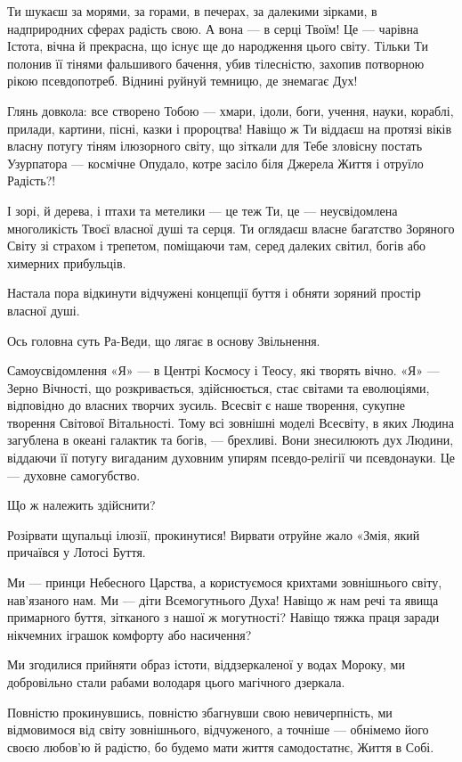 Ти шукаєш за морями, за горами, в печерах, за далекими зірками, в надприродних
сферах радість свою. А вона — в серці Твоїм! Це — чарівна Істота, вічна й
прекрасна, що існує ще до народження цього світу. Тільки Ти полонив її тінями
фальшивого бачення, убив тілесністю, захопив потворною рікою псевдопотреб.
Віднині руйнуй темницю, де знемагає Дух!

Глянь довкола: все створено Тобою — хмари, ідоли, боги, учення, науки, кораблі,
прилади, картини, пісні, казки і пророцтва! Навіщо ж Ти віддаєш на протязі
віків власну потугу тіням ілюзорного світу, що зіткали для Тебе зловісну
постать Узурпатора — космічне Опудало, котре засіло біля Джерела Життя і
отруїло Радість?!

І зорі, й дерева, і птахи та метелики — це теж Ти, це — неусвідомлена
многоликість Твоєї власної душі та серця. Ти оглядаєш власне багатство Зоряного
Світу зі страхом і трепетом, поміщаючи там, серед далеких світил, богів або
химерних прибульців.

Настала пора відкинути відчужені концепції буття і обняти зоряний простір
власної душі.

Ось головна суть Ра-Веди, що лягає в основу Звільнення.

Самоусвідомлення «Я» — в Центрі Космосу і Теосу, які творять вічно. «Я» — Зерно
Вічності, що розкривається, здійснюється, стає світами та еволюціями,
відповідно до власних творчих зусиль. Всесвіт є наше творення, сукупне творення
Світової Вітальності. Тому всі зовнішні моделі Всесвіту, в яких Людина
загублена в океані галактик та богів, — брехливі. Вони знесилюють дух Людини,
віддаючи її потугу вигаданим духовним упирям псевдо-релігії чи псевдонауки. Це
— духовне самогубство.

Що ж належить здійснити?

Розірвати щупальці ілюзії, прокинутися! Вирвати отруйне жало «Змія, який
причаївся у Лотосі Буття.

Ми — принци Небесного Царства, а користуємося крихтами зовнішнього світу,
нав’язаного нам. Ми — діти Всемогутнього Духа! Навіщо ж нам речі та явища
примарного буття, зітканого з нашої ж могутності? Навіщо тяжка праця заради
нікчемних іграшок комфорту або насичення?

Ми згодилися прийняти образ істоти, віддзеркаленої у водах Мороку, ми
добровільно стали рабами володаря цього магічного дзеркала.

Повністю прокинувшись, повністю збагнувши свою невичерпність, ми відмовимося
від світу зовнішнього, відчуженого, а точніше — обнімемо його своєю любов’ю й
радістю, бо будемо мати життя самодостатнє, Життя в Собі.

